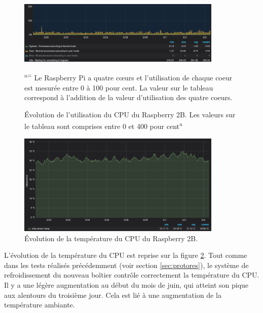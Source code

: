 \begin{figure}[ht!]
  \centering
  \includegraphics[width=0.87\textwidth]{img/tests/cpu_usage.png}
  \caption{Évolution de l'utilisation du CPU du Raspberry 2B. Les valeurs sur le tableau sont comprises entre 0 et 400 pour cent\textsuperscript{a}}
  \small\textsuperscript{a=} Le Raspberry Pi a quatre cœurs et l'utilisation de chaque coeur est mesurée entre 0 à 100 pour cent. \noindent La valeur sur le tableau correspond à l'addition de la valeur d'utilisation des quatre coeurs.
  \label{fig:cpu_usage}
\end{figure}


\begin{figure}[ht!]
  \centering
  \includegraphics[width=0.87\textwidth]{img/tests/temps.png}
  \caption{Évolution de la température du CPU du Raspberry 2B.}
  \label{fig:cputemp}
\end{figure}


\noindent
L'évolution de la température du CPU est reprise sur la figure \ref{fig:cputemp}. Tout comme dans les tests réalisés précédemment (voir section \ref{sec:protores}), le système de refroidissement du nouveau boîtier contrôle correctement la température du CPU. Il y a une légère augmentation au début du mois de juin, qui atteint son pique aux alentours du troisième jour. Cela est lié à une augmentation de la température ambiante.



